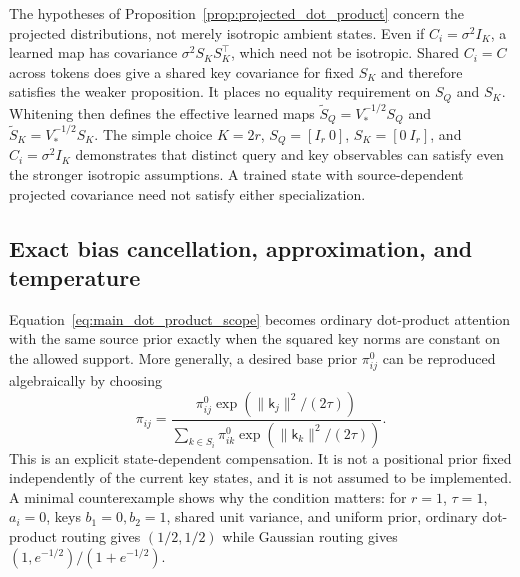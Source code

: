 \documentclass[twoside,11pt]{article}
\begin{document}
The hypotheses of Proposition~\ref{prop:projected_dot_product} concern the projected distributions, not merely isotropic ambient states. Even if $C_i=\sigma^2I_K$, a learned map has covariance $\sigma^2S_KS_K^\top$, which need not be isotropic. Shared $C_i=C$ across tokens does give a shared key covariance for fixed $S_K$ and therefore satisfies the weaker proposition. It places no equality requirement on $S_Q$ and $S_K$. Whitening then defines the effective learned maps $\widetilde S_Q=V_*^{-1/2}S_Q$ and $\widetilde S_K=V_*^{-1/2}S_K$. The simple choice $K=2r$, $S_Q=[I_r\ 0]$, $S_K=[0\ I_r]$, and $C_i=\sigma^2I_K$ demonstrates that distinct query and key observables can satisfy even the stronger isotropic assumptions. A trained state with source-dependent projected covariance need not satisfy either specialization.

\subsection{Exact bias cancellation, approximation, and temperature}
\label{sec:bias_cancellation}

Equation~\eqref{eq:main_dot_product_scope} becomes ordinary dot-product attention with the same source prior exactly when the squared key norms are constant on the allowed support. More generally, a desired base prior $\pi^0_{ij}$ can be reproduced algebraically by choosing
\begin{equation}
\pi_{ij}=
\frac{\pi^0_{ij}\exp(\|\mathsf k_j\|^2/(2\tau))}
{\sum_{k\in S_i}\pi^0_{ik}\exp(\|\mathsf k_k\|^2/(2\tau))}.
\label{eq:projected_key_bias_compensation}
\end{equation}
This is an explicit state-dependent compensation. It is not a positional prior fixed independently of the current key states, and it is not assumed to be implemented. A minimal counterexample shows why the condition matters: for $r=1$, $\tau=1$, $a_i=0$, keys $b_1=0,b_2=1$, shared unit variance, and uniform prior, ordinary dot-product routing gives $(1/2,1/2)$ while Gaussian routing gives $(1,e^{-1/2})/(1+e^{-1/2})$.
\end{document}
